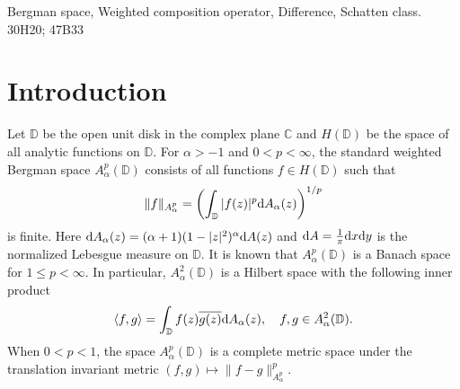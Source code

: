 \documentclass[preprint,12pt,times]{elsarticle}
\theoremstyle{definition}
\theoremstyle{remark}
\numberwithin{equation}{section}
\begin{document}
\begin{frontmatter}
%

\begin{keyword}
Bergman space, Weighted composition operator, Difference, Schatten class.
\MSC[2020] 30H20; 47B33

\end{keyword}

\end{frontmatter}


\section{Introduction}

Let $\mathbb{D}$ be the open unit disk in the complex plane $\mathbb{C}$ and $H(\mathbb{D})$ be the space of all analytic functions on $\mathbb{D}$. For $\alpha>-1$ and $0<p<\infty$, the standard weighted Bergman space $A_{\alpha}^p(\mathbb{D})$ consists of all functions $f\in H(\mathbb{D})$ such that
\[\|f\|_{A_{\alpha}^p}=\left(\int_{\mathbb{D}}|f(z)|^p{\rm d}A_{\alpha}(z)\right)^{1/p}\]
is finite. Here ${\rm d}A_{\alpha}(z)=(\alpha+1)(1-|z|^2)^{\alpha}{\rm d}A(z)$ and ${\rm d}A=\frac{1}{\pi}{\rm d}x{\rm d}y$ is the normalized Lebesgue measure on $\mathbb{D}$. It is known that $A_{\alpha}^p(\mathbb{D})$ is a Banach space for $1\leq p<\infty$. In particular, $A_{\alpha}^2(\mathbb{D})$ is a Hilbert space with the following inner product
\[\langle f, g\rangle=\int_{\mathbb{D}}f(z)\overline{g(z)}{\rm d}A_{\alpha}(z),\quad f,g\in A_{\alpha}^2(\mathbb{D}).\]
When $0<p<1$, the space $A_{\alpha}^p(\mathbb{D})$ is a complete metric space under the translation invariant metric $(f,g)\mapsto \|f-g\|_{A_{\alpha}^p}^p$.
\end{document}
